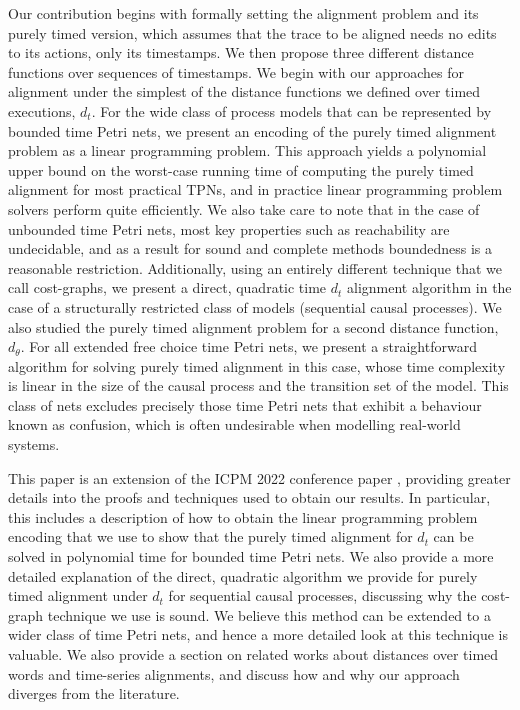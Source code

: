 \documentclass[conference]{IEEEtran}
\begin{document}
 
Our contribution begins with formally setting the alignment problem and its purely timed version, which assumes that the trace to be aligned needs no edits to its actions, only its timestamps. We then propose three different distance functions over sequences of timestamps. 
We begin with our approaches for alignment under the simplest of the distance functions we defined over timed executions, $d_t$. 
For the wide class of process models that can be represented by bounded time Petri nets, we present an encoding of the purely timed alignment problem as a linear programming problem. 
This approach yields a polynomial upper bound on the worst-case running time of computing the purely timed alignment for most practical TPNs, and in practice linear programming problem solvers perform quite efficiently. We also take care to note that in the case of unbounded time Petri nets, most key properties such as reachability are undecidable, and as a result for sound and complete methods boundedness is a reasonable restriction. 
 Additionally, using an entirely different technique that we call cost-graphs, we present a direct, quadratic time $d_t$ alignment algorithm in the case of a structurally restricted class of models (sequential causal processes).
We also studied %
 the purely timed alignment problem for a second distance function, $d_{\theta}$. 
For all extended free choice time Petri nets, we present a straightforward algorithm for solving purely timed alignment in this case, whose time complexity is linear in the size of the causal process and the transition set of the model. 
This class of nets excludes precisely those time Petri nets that exhibit a behaviour known as confusion, which is often undesirable when modelling real-world systems. 

This paper is an extension of the ICPM 2022 conference paper \cite{CR22}, providing greater details into the proofs and techniques used to obtain our results. 
In particular, this includes a description of how to obtain the linear programming problem encoding that we use to show that the purely timed alignment for $d_t$ can be solved in polynomial time for bounded time Petri nets. 
We also provide a more detailed explanation of the direct, quadratic algorithm we provide for purely timed alignment under $d_t$ for sequential causal processes, discussing why the cost-graph technique we use is sound. 
We believe this method can be extended to a wider class of time Petri nets, and hence a more detailed look at this technique is valuable.
We also provide a section on related works about distances over timed words and time-series alignments, and discuss how and why our approach diverges from the literature.  
    
\end{document}
